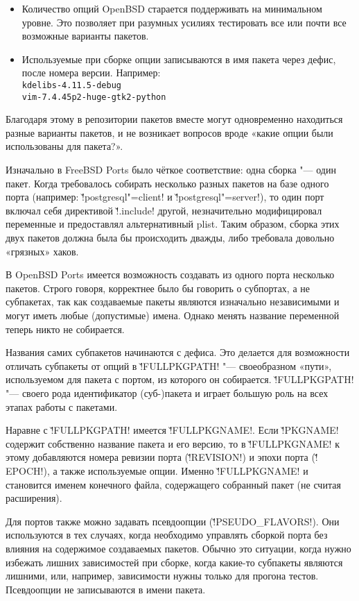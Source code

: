 \documentclass[10pt, a5paper]{article}
\begin{document}
\begin{itemize}
  \item Количество опций OpenBSD старается поддерживать на минимальном уровне. Это позволяет при разумных усилиях тестировать все или почти все возможные варианты пакетов.
  \item Используемые при сборке опции записываются в имя пакета через дефис, после номера версии. Например:\\
\verb!kdelibs-4.11.5-debug!\\
\verb!vim-7.4.45p2-huge-gtk2-python!
\end{itemize}


Благодаря этому в репозитории пакетов вместе могут одновременно находиться разные варианты пакетов, и не возникает вопросов вроде «какие опции были использованы для пакета?».

Изначально в FreeBSD Ports было чёткое соответствие: одна сборка "--- один пакет. Когда требовалось собирать несколько разных пакетов на базе одного порта (например: \v!postgresql"=client! и \v!postgresql"=server!), то один порт включал себя директивой \v!.in\-clu\-de! другой, незначительно модифицировал переменные и предоставлял альтернативный plist. Таким образом, сборка этих двух пакетов должна была бы происходить дважды, либо требовала довольно «грязных» хаков.

В OpenBSD Ports имеется возможность создавать из одного порта несколько пакетов. Строго говоря, корректнее было бы говорить о субпортах, а не субпакетах, так как создаваемые пакеты являются изначально независимыми и могут иметь любые (допустимые) имена. Однако менять название переменной теперь никто не собирается.

Названия самих субпакетов начинаются с дефиса. Это делается для возможности отличать субпакеты от опций в \v!FULL\-PKG\-PATH! "--- своеобразном «пути», используемом для пакета с портом, из которого он собирается. \v!FULL\-PKG\-PATH! "--- своего рода идентификатор (суб-)пакета и играет большую роль на всех этапах работы с пакетами.

Наравне с \v!FULLPKGPATH! имеется \v!FULL\-PKG\-NAME!. Если \v!PKG\-NAME! содержит собственно название пакета и его версию, то в \v!FULL\-PKG\-NAME! к этому добавляются номера ревизии порта (\v!RE\-VI\-SI\-ON!) и эпохи порта (\v!EPOCH!), а также используемые опции. Именно \v!FULL\-PKG\-NAME! и становится именем конечного файла, содержащего собранный пакет (не считая расширения).

Для портов также можно задавать псевдоопции (\v!PSEUDO\_FLA\-VORS!). Они используются в тех случаях, когда необходимо управлять сборкой порта без влияния на содержимое создаваемых пакетов. Обычно это ситуации, когда нужно избежать лишних зависимостей при сборке, когда какие-то субпакеты являются лишними, или, например, зависимости нужны только для прогона тестов. Псевдоопции не записываются в имени пакета.
\end{document}
